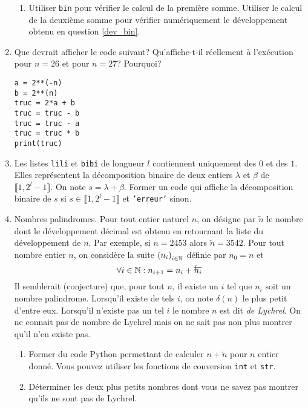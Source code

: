 \begin{enumerate}
\begin{enumerate}
  \item Utiliser \texttt{bin} pour vérifier le calcul de la première somme. Utiliser le calcul de la deuxième somme pour vérifier numériquement le développement obtenu en question \ref{dev_bin}.
\end{enumerate} 

\item Que devrait afficher le code suivant? Qu'affiche-t-il réellement à l'exécution pour $n =26$ et pour $n=27$? Pourquoi?
\begin{verbatim}
a = 2**(-n)
b = 2**(n)
truc = 2*a + b
truc = truc - b
truc = truc - a
truc = truc * b
print(truc)
\end{verbatim}

\item Les listes \texttt{lili} et \texttt{bibi} de longueur $l$ contiennent uniquement des $0$ et des $1$. Elles représentent la décomposition binaire de deux entiers $\lambda$ et $\beta$ de $\llbracket 1, 2^l -1\rrbracket$. On note $s=\lambda + \beta$.\newline
Former un code qui affiche la décomposition binaire de $s$ si $s\in \llbracket 1, 2^l -1\rrbracket$ et \texttt{'erreur'} sinon. 

\item Nombres palindromes.\newline
Pour tout entier naturel $n$, on désigne par $\overleftarrow{n}$ le nombre dont le développement décimal est obtenu en retournant la liste du développement de $n$. Par exemple, si $n = 2453$ alors $\overleftarrow{n}=3542$.\newline
Pour tout nombre entier $n$, on considère la suite $\left( n_i \right)_{i\in\mathbb{N}}$ définie par $n_0 = n$ et 
\begin{displaymath}
  \forall i\in \mathbb{N} : n_{i+1} = n_i + \overleftarrow{n_i}
\end{displaymath}
Il semblerait (conjecture) que, pour tout $n$, il existe un $i$ tel que $n_i$ soit un nombre palindrome. Lorsqu'il existe de tels $i$, on note $\delta(n)$ le plus petit d'entre eux. Lorsqu'il n'existe pas un tel $i$ le nombre $n$ est dit \emph{de Lychrel}. On ne connait pas de nombre de Lychrel mais on ne sait pas non plus montrer qu'il n'en existe pas.
\begin{enumerate}
  \item Former du code Python permettant de calculer $n+\overleftarrow{n}$ pour $n$ entier donné. Vous pouvez utiliser les fonctions de conversion \texttt{int} et \texttt{str}.
  \item Déterminer les deux plus petits nombres dont vous ne savez pas montrer qu'ils ne sont pas de Lychrel.
\end{enumerate}

\end{enumerate}
